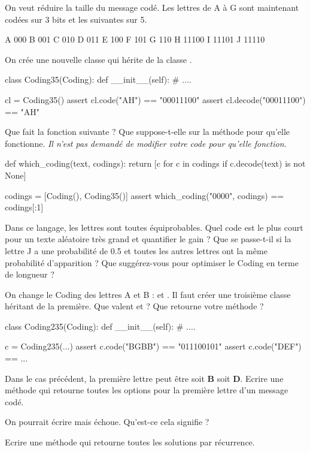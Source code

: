 \begin{xexercice}
\exequest On veut réduire la taille du message codé.
Les lettres de A à G sont maintenant codées sur 3 bits et les suivantes sur 5.

\begin{verbatimx}
A 000
B 001
C 010
D 011
E 100
F 101
G 110
H 11100
I 11101
J 11110
\end{verbatimx}

On crée une nouvelle classe  qui hérite de la classe .

\begin{verbatimx}
class Coding35(Coding):
    def __init__(self):
        # ....

cl = Coding35()
assert cl.code("AH") == "00011100"
assert cl.decode("00011100") == "AH"
\end{verbatimx}

\exequest Que fait la fonction suivante ? Que suppose-t-elle sur la méthode  pour qu'elle fonctionne.
\textit{Il n'est pas demandé de modifier votre code pour qu'elle fonction.}

\begin{verbatimx}
def which_coding(text, codings):
    return [c for c in codings if c.decode(text) is not None]

codings = [Coding(), Coding35()]
assert which_coding("0000", codings) == codings[:1]
\end{verbatimx}

\exequest Dans ce langage, les lettres sont toutes équiprobables.
Quel code est le plus court pour un texte aléatoire très grand et quantifier le gain ?
Que se passe-t-il si la lettre J a une probabilité de 0.5 et toutes les autres lettres ont la même probabilité
d'apparition ? Que suggérez-vous pour optimiser le Coding en terme de longueur ?

\exequest On change le Coding des lettres A et B :  et . Il faut créer une troisième classe
héritant de la première. Que valent  et  ?
Que retourne votre méthode  ?

\begin{verbatimx}
class Coding235(Coding):
    def __init__(self):
        # ....

c = Coding235(...)
assert c.code("BGBB") == "011100101"
assert c.code("DEF") == ...
\end{verbatimx}

\exequest Dans le cas précédent, la première lettre peut être soit \textbf{B} soit \textbf{D}.
Ecrire une méthode qui retourne toutes les options pour la première lettre d'un message codé.

\exequest On pourrait écrire  mais
 échoue. Qu'est-ce cela signifie ?


\exequest Ecrire une méthode  qui retourne toutes les solutions par récurrence.


\end{xexercice}




%
